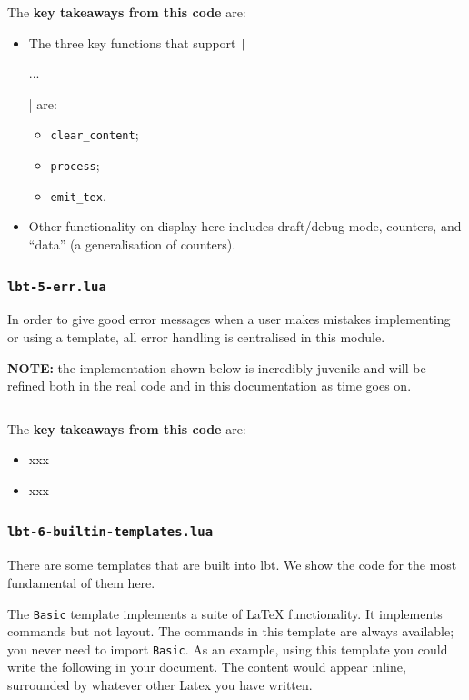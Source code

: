 \documentclass[11pt]{article}
\newcommand{\lbtlabel}{\textsf{lbt}}
\begin{document}
The \textbf{key takeaways from this code} are:
\begin{itemize}
  \item The three key functions that support \texttt|\begin{lbt} ... \end{lbt}| are:
  \begin{itemize}
    \item \texttt{clear\_content};
    \item \texttt{process};
    \item \texttt{emit\_tex}.
  \end{itemize}
  \item Other functionality on display here includes draft/debug mode, counters, and ``data'' (a generalisation of counters).
\end{itemize}


\subsubsection{\texttt{lbt-5-err.lua}}

In order to give good error messages when a user makes mistakes implementing or using a template, all error handling is centralised in this module.

\textbf{NOTE:} the implementation shown below is incredibly juvenile and will be refined both in the real code and in this documentation as time goes on.

\inputminted{lua}{media/impl-lbt-5-err.lua}

The \textbf{key takeaways from this code} are:
\begin{itemize}
  \item xxx
  \item xxx
\end{itemize}


\subsubsection{\texttt{lbt-6-builtin-templates.lua}}

There are some templates that are built into \lbtlabel{}. We show the code for the most fundamental of them here.

The \texttt{Basic} template implements a suite of \LaTeX{} functionality. It implements commands but not layout. The commands in this template are always available; you never need to import \texttt{Basic}. As an example, using this template you could write the following in your document. The content would appear inline, surrounded by whatever other Latex you have written.
\end{document}
